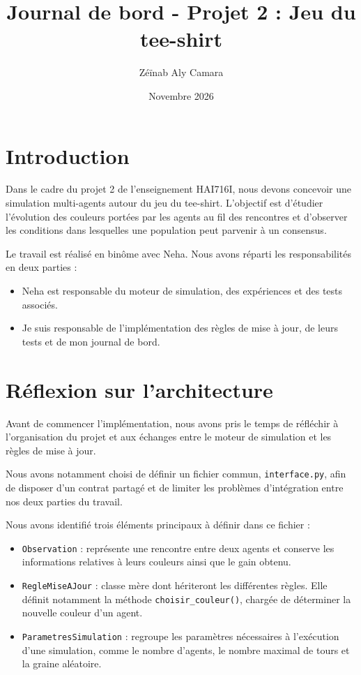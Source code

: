 \documentclass[12pt,a4paper]{article}
\begin{document}
\title{Journal de bord - Projet 2 : Jeu du tee-shirt}
\author{Zéïnab Aly Camara}
\date{Novembre 2026}

\maketitle
\tableofcontents
\newpage

\section{Introduction}

Dans le cadre du projet 2 de l'enseignement HAI716I, nous devons
concevoir une simulation multi-agents autour du jeu du tee-shirt.
L'objectif est d'étudier l'évolution des couleurs portées par les
agents au fil des rencontres et d'observer les conditions dans
lesquelles une population peut parvenir à un consensus.

Le travail est réalisé en binôme avec Neha. Nous avons réparti
les responsabilités en deux parties :
\begin{itemize}
    \item Neha est responsable du moteur de simulation, des
    expériences et des tests associés.
    \item Je suis responsable de l'implémentation des règles
    de mise à jour, de leurs tests et de mon journal de bord.
\end{itemize}

\section{Réflexion sur l'architecture}

Avant de commencer l'implémentation, nous avons pris le temps
de réfléchir à l'organisation du projet et aux échanges entre
le moteur de simulation et les règles de mise à jour.

Nous avons notamment choisi de définir un fichier commun,
\texttt{interface.py}, afin de disposer d'un contrat partagé
et de limiter les problèmes d'intégration entre nos deux
parties du travail.

Nous avons identifié trois éléments principaux à définir
dans ce fichier :

\begin{itemize}
    \item \texttt{Observation} : représente une rencontre entre
    deux agents et conserve les informations relatives à leurs
    couleurs ainsi que le gain obtenu.

    \item \texttt{RegleMiseAJour} : classe mère dont hériteront
    les différentes règles. Elle définit notamment la méthode
    \texttt{choisir\_couleur()}, chargée de déterminer la nouvelle
    couleur d'un agent.

    \item \texttt{ParametresSimulation} : regroupe les paramètres
    nécessaires à l'exécution d'une simulation, comme le nombre
    d'agents, le nombre maximal de tours et la graine aléatoire.
\end{itemize}
\end{document}
